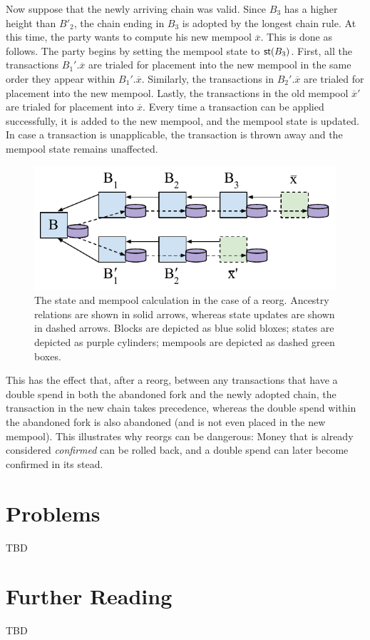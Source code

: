 Now suppose that the newly arriving chain was valid. Since $B_3$ has a higher height than $B'_2$,
the chain ending in
$B_3$ is adopted by the longest chain rule.
At this time, the party wants to compute his new mempool $\overline{x}$.
This is done as follows. The party begins by setting the mempool state to $\mathsf{st}(B_3)$.
First, all the transactions $B_1'.\overline{x}$ are trialed for placement into the new
mempool in the same order they appear within $B_1'.\overline{x}$. Similarly, the
transactions in $B_2'.\overline{x}$ are trialed for placement into the new mempool.
Lastly, the transactions in the old mempool $\overline{x}'$ are trialed for placement
into $\overline{x}$. Every time a transaction can be applied successfully, it is
added to the new mempool, and the mempool state is updated. In case a transaction
is unapplicable, the transaction is thrown away and the mempool state remains unaffected.

\begin{figure}[h]
    \centering
    \includegraphics[width=0.7 \columnwidth,keepaspectratio]{figures/chain-state-validation.pdf}
    \caption{The state and mempool calculation in the case of a reorg. Ancestry relations
             are shown in solid arrows, whereas state updates are shown in dashed arrows.
             Blocks are depicted as blue solid bloxes; states are depicted as purple cylinders;
             mempools are depicted as dashed green boxes.}
    \label{fig.chain-state-validation}
\end{figure}

This has the effect that, after a reorg, between any transactions that have a double spend in both
the abandoned fork and the newly adopted chain, the transaction in the new
chain takes precedence, whereas the double spend within the abandoned fork is also abandoned
(and is not even placed in the new mempool). This illustrates why reorgs can be dangerous:
Money that is already considered \emph{confirmed} can be rolled back, and a double spend can later
become confirmed in its stead.


\section{Problems}

TBD

\section{Further Reading}

TBD
